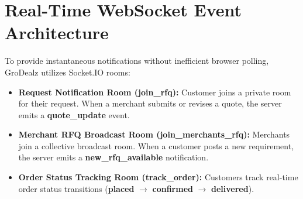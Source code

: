 \section{Real-Time WebSocket Event Architecture}

To provide instantaneous notifications without inefficient browser polling, GroDealz utilizes Socket.IO rooms:
\begin{itemize}
    \item \textbf{Request Notification Room (join\_rfq):} Customer joins a private room for their request. When a merchant submits or revises a quote, the server emits a \textbf{quote\_update} event.
    \item \textbf{Merchant RFQ Broadcast Room (join\_merchants\_rfq):} Merchants join a collective broadcast room. When a customer posts a new requirement, the server emits a \textbf{new\_rfq\_available} notification.
    \item \textbf{Order Status Tracking Room (track\_order):} Customers track real-time order status transitions (\textbf{placed} $\to$ \textbf{confirmed} $\to$ \textbf{delivered}).
\end{itemize}
